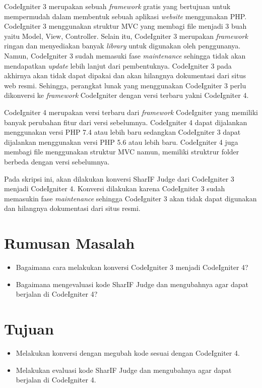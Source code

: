 \documentclass[a4paper,twoside]{article}
\begin{document}
CodeIgniter 3 merupakan sebuah \textit{framework} gratis yang bertujuan untuk mempermudah dalam membentuk sebuah aplikasi \textit{website} menggunakan PHP. CodeIgniter 3 menggunakan struktur MVC yang membagi file menjadi 3 buah yaitu Model, View, Controller. Selain itu, CodeIgniter 3 merupakan \textit{framework} ringan dan menyediakan banyak \textit{library} untuk digunakan oleh penggunanya. Namun, CodeIgniter 3 sudah memasuki fase \textit{maintenance} sehingga tidak akan mendapatkan \textit{update} lebih lanjut dari pembentuknya. CodeIgniter 3 pada akhirnya akan tidak dapat dipakai dan akan hilangnya dokumentasi dari situs web resmi. Sehingga, perangkat lunak yang menggunakan CodeIgniter 3 perlu dikonversi ke \textit{framework} CodeIgniter dengan versi terbaru yakni CodeIgniter 4.

CodeIgniter 4 merupakan versi terbaru dari \textit{framework} CodeIgniter yang memiliki banyak perubahan fitur dari versi sebelumnya. CodeIgniter 4 dapat dijalankan menggunakan versi PHP 7.4 atau lebih baru sedangkan CodeIgniter 3 dapat dijalankan menggunakan versi PHP 5.6 atau lebih baru. CodeIgniter 4 juga membagi file menggunakan struktur MVC namun, memiliki struktrur folder berbeda dengan versi sebelumnya.

Pada skripsi ini, akan dilakukan konversi SharIF Judge dari CodeIgniter 3 menjadi CodeIgniter 4. Konversi dilakukan karena CodeIgniter 3 sudah memasukin fase \textit{maintenance} sehingga CodeIgniter 3 akan tidak dapat digunakan dan hilangnya dokumentasi dari situs resmi.


\section{Rumusan Masalah}
\begin{itemize}
	\item Bagaimana cara melakukan konversi CodeIgniter 3 menjadi CodeIgniter 4?
	\item Bagaimana mengevaluasi kode SharIF Judge dan mengubahnya agar dapat berjalan di CodeIgniter 4?
\end{itemize}

\section{Tujuan}
\begin{itemize}
	\item Melakukan konversi dengan megubah kode sesuai dengan CodeIgniter 4.
	\item Melakukan evaluasi kode SharIF Judge dan mengubahnya agar dapat berjalan di CodeIgniter 4.
\end{itemize}
\end{document}
